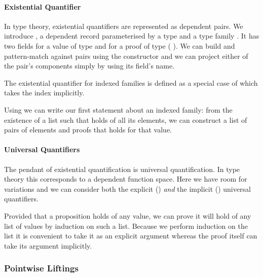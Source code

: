 \paragraph{Existential Quantifier}\label{def:sigma} In type theory, existential
quantifiers are represented as dependent pairs. We introduce , a dependent
record parameterised by a type  and a type family . It has two fields
 for a value of type  and  for a proof of type
{( )}. We can build and pattern-match against pairs using the
constructor \AIC{\_,\_} and we can project either of the pair's components simply
by using its field's name.


The existential quantifier for indexed families is defined as a special
case of  which takes the index  implicitly.


Using  we can write our first statement about an indexed family:
from the existence of a list such that  holds of all its elements,
we can construct a list of pairs of elements and proofs that  holds
for that value.


\paragraph{Universal Quantifiers} The pendant of existential quantification
is universal quantification. In type theory this corresponds to a dependent
function space. Here we have room for variations and we can consider both
the explicit () \emph{and} the implicit () universal
quantifiers.


Provided that a proposition holds of any value, we can prove it will hold
of any list of values by induction on such a list. Because we perform
induction on the list it is convenient to take it as an explicit argument
whereas the proof itself can take its argument implicitly.


\subsubsection{Pointwise Liftings}\label{sec:liftings}

